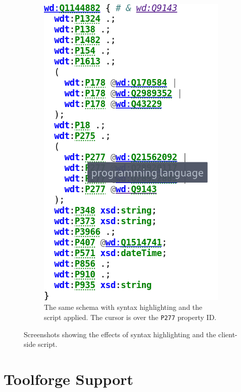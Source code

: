 \begin{figure}[t]
\begin{subfigure}[t]{0.45\textwidth}
    \includegraphics[trim={0 2.5cm 0 0},clip]{screenshots/shexc-with-syntax-highlighting}
    \caption[The same schema with syntax highlighting and the script applied.]{
      The same schema with syntax highlighting and the script applied.
      The cursor is over the \lstinline{P277} \gls{property ID}.
    }
    \label{fig:shexc-syntax-highlighting-with}
  \end{subfigure}
  \caption{
    Screenshots showing the effects of syntax highlighting and the client-side script.
  }
  \label{fig:shexc-syntax-highlighting}
\end{figure}

\section{Toolforge Support}
\label{sec:wdsi:Toolforge}

